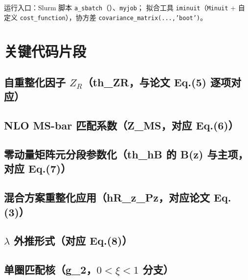 \documentclass[UTF8]{ctexart}
\begin{document}
运行入口：Slurm 脚本 \texttt{a\_sbatch}（\texttt{}）、\texttt{myjob}；
拟合工具 \texttt{iminuit}（\texttt{Minuit} + 自定义 \texttt{cost\_function}），协方差 \texttt{covariance\_matrix(...,'boot')}。

\section{关键代码片段}

\subsection{自重整化因子 $Z_R$（th\_ZR，与论文 Eq.(5) 逐项对应）}



\subsection{NLO MS-bar 匹配系数（Z\_MS，对应 Eq.(6)）}



\subsection{零动量矩阵元分段参数化（th\_hB 的 B(z) 与主项，对应 Eq.(7)）}



\subsection{混合方案重整化应用（hR\_z\_Pz，对应论文 Eq.(3)）}



\subsection{$\lambda$ 外推形式（对应 Eq.(8)）}



\subsection{单圈匹配核（g\_2，$0<\xi<1$ 分支）}
\end{document}
